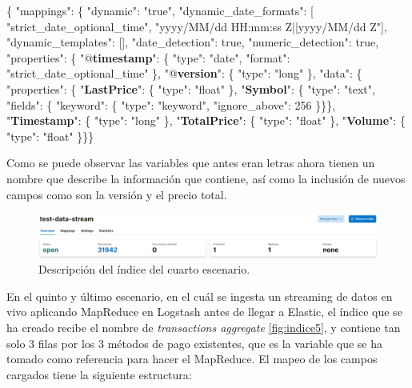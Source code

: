 \{ "mappings": \{ "dynamic": "true", "dynamic\_date\_formats": [ "strict\_date\_optional\_time", "yyyy/MM/dd HH:mm:ss Z||yyyy/MM/dd Z"], "dynamic\_templates": [], "date\_detection": true, "numeric\_detection": true, "properties": \{ "@\textbf{timestamp}": \{ "type": "date", "format": "strict\_date\_optional\_time" \}, "@\textbf{version}": \{ "type": "long" \}, "data": \{ "properties": \{ "\textbf{LastPrice}": \{ "type": "float" \}, "\textbf{Symbol}": \{ "type": "text", "fields": \{ "keyword": \{ "type": "keyword", "ignore\_above": 256 \}\}\}, "\textbf{Timestamp}": \{ "type": "long" \}, "\textbf{TotalPrice}": \{ "type": "float" \}, "\textbf{Volume}": \{ "type": "float" \}\}\}

Como se puede observar las variables que antes eran letras ahora tienen un nombre que describe la información que contiene, así como la inclusión de nuevos campos como son la versión y el precio total.

\begin{figure}
    \centering
    \includegraphics[width=1\linewidth]{img/indice4.png}
    \caption{Descripción del índice del cuarto escenario.}
    \label{fig:indice4}
\end{figure}

En el quinto y último escenario, en el cuál se ingesta un streaming de datos en vivo aplicando MapReduce en Logstash antes de llegar a Elastic, el índice que se ha creado recibe el nombre de \textit{transactions aggregate} \ref{fig:indice5}, y contiene tan solo 3 filas por los 3 métodos de pago existentes, que es la variable que se ha tomado como referencia para hacer el MapReduce. El mapeo de los campos cargados tiene la siguiente estructura:

